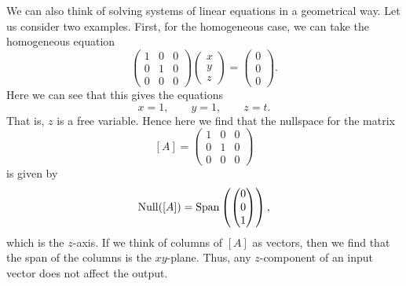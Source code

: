         We can also think of solving systems of linear equations in a geometrical way.  Let us consider two examples.  First, for the homogeneous case, we can take the homogeneous equation
        \[
        \begin{pmatrix} 1 & 0 & 0 \\ 0 & 1 & 0 \\ 0 & 0 & 0 \end{pmatrix} \begin{pmatrix} x \\ y \\ z \end{pmatrix} = \begin{pmatrix} 0 \\ 0 \\ 0 \end{pmatrix}.
        \]
        Here we can see that this gives the equations
        \[
        x=1,\qquad y=1,\qquad z=t.
        \]
        That is, $z$ is a free variable.  Hence here we find that the nullspace for the matrix 
        \[
        [A]=\begin{pmatrix} 1 & 0 & 0 \\ 0 & 1 & 0 \\ 0 & 0 & 0 \end{pmatrix}
        \]
        is given by
        \[
        \mathrm{Null}([A])=\mathrm{Span}\left( \begin{pmatrix} 0 \\ 0 \\ 1 \end{pmatrix}\right),
        \]
        which is the $z$-axis. If we think of columns of $[A]$ as vectors, then we find that the span of the columns is the $xy$-plane.  Thus, any $z$-component of an input vector does not affect the output.
        
